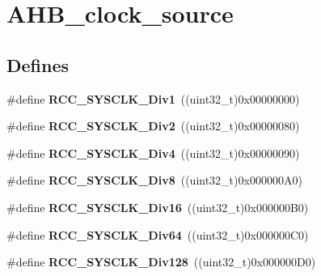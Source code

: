 \hypertarget{group__AHB__clock__source}{
\section{AHB\_\-clock\_\-source}
\label{group__AHB__clock__source}
}
\subsection*{Defines}
\begin{DoxyCompactItemize}
\item 
\hypertarget{group__AHB__clock__source_gadc3ac37d90c2082d640e5948fac0878f}{
\#define {\bfseries RCC\_\-SYSCLK\_\-Div1}~((uint32\_\-t)0x00000000)}
\label{group__AHB__clock__source_gadc3ac37d90c2082d640e5948fac0878f}

\item 
\hypertarget{group__AHB__clock__source_gacadd82156776154a07d128b454fc69fd}{
\#define {\bfseries RCC\_\-SYSCLK\_\-Div2}~((uint32\_\-t)0x00000080)}
\label{group__AHB__clock__source_gacadd82156776154a07d128b454fc69fd}

\item 
\hypertarget{group__AHB__clock__source_ga458f8ae63164e878930dbebd7643f087}{
\#define {\bfseries RCC\_\-SYSCLK\_\-Div4}~((uint32\_\-t)0x00000090)}
\label{group__AHB__clock__source_ga458f8ae63164e878930dbebd7643f087}

\item 
\hypertarget{group__AHB__clock__source_gade72fe3aca89f3e8c4fe8692ea217912}{
\#define {\bfseries RCC\_\-SYSCLK\_\-Div8}~((uint32\_\-t)0x000000A0)}
\label{group__AHB__clock__source_gade72fe3aca89f3e8c4fe8692ea217912}

\item 
\hypertarget{group__AHB__clock__source_gaefd8df4be9c9dbd9cebfb2384933500a}{
\#define {\bfseries RCC\_\-SYSCLK\_\-Div16}~((uint32\_\-t)0x000000B0)}
\label{group__AHB__clock__source_gaefd8df4be9c9dbd9cebfb2384933500a}

\item 
\hypertarget{group__AHB__clock__source_gab6a2c2d4e945c607259988a9b6df26e5}{
\#define {\bfseries RCC\_\-SYSCLK\_\-Div64}~((uint32\_\-t)0x000000C0)}
\label{group__AHB__clock__source_gab6a2c2d4e945c607259988a9b6df26e5}

\item 
\hypertarget{group__AHB__clock__source_ga1a28926fcb86112058a365e01fe9a46b}{
\#define {\bfseries RCC\_\-SYSCLK\_\-Div128}~((uint32\_\-t)0x000000D0)}
\label{group__AHB__clock__source_ga1a28926fcb86112058a365e01fe9a46b}


\end{DoxyCompactItemize}
